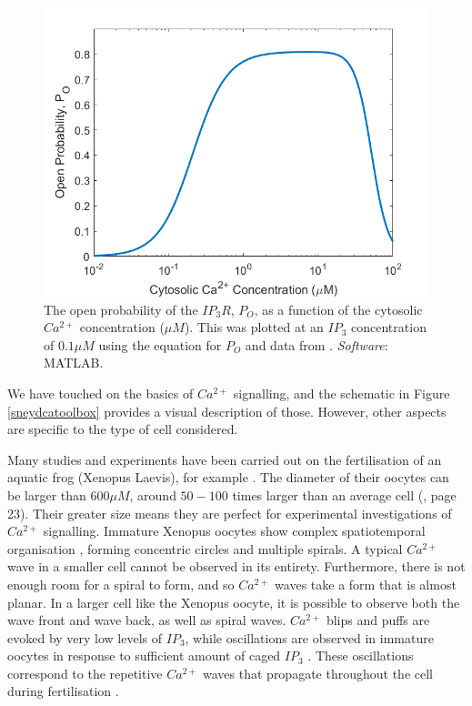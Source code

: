 {\begin{figure}[h!!!t!!!b!!!p]
  \centering
  \includegraphics[width=0.65\linewidth]{Chapters/1_Introduction/extras/biphasicsketch.png}
  \caption{The open probability of the $IP_3R$, $P_O$, as a function of the cytosolic $Ca^{2+}$ concentration ($\mu M$). This was plotted at an $IP_3$ concentration of $0.1 \mu M$ using the equation for $P_O$ and data from . \textit{Software}: MATLAB. }\label{biphasicsketch}
\end{figure}

We have touched on the basics of $Ca^{2+}$ signalling, and the schematic in Figure \ref{sneydcatoolbox} provides a visual description of those. However, other aspects are specific to the type of cell considered.

Many studies and experiments have been carried out on the fertilisation of an aquatic frog (Xenopus Laevis), for example . The diameter of their oocytes can be larger than {$600\mu M$}, around $50-100$ times larger than an average cell (, page 23). Their greater size means they are perfect for experimental investigations of $Ca^{2+}$ signalling. {Immature Xenopus oocytes show complex spatiotemporal organisation , forming concentric circles and multiple spirals. A typical $Ca^{2+}$ wave in a smaller cell cannot be observed in its entirety. Furthermore, there is not enough room for a spiral to form, and so $Ca^{2+}$ waves take a form that is almost planar. In a larger cell like the Xenopus oocyte, it is possible to observe both the wave front and wave back, as well as spiral waves.} $Ca^{2+}$ blips and puffs are evoked by very low levels of $IP_3$, while oscillations are observed in immature oocytes in response to sufficient amount of caged $IP_3$ . These oscillations correspond to the repetitive $Ca^{2+}$ waves that propagate throughout the cell during fertilisation .

}
